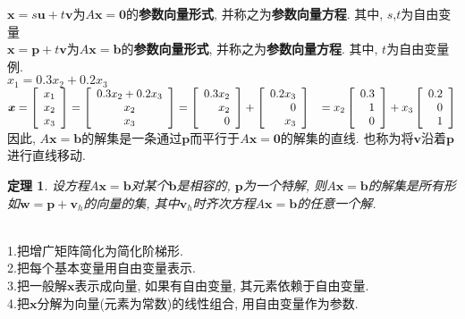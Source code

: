 \documentclass[UTF8,fontset=ubuntu]{ctexart}
\theoremstyle{nonumberplain}
\theoremstyle{break}
\newtheorem{theorem}{定理}
\theoremstyle{empty}
\begin{document}
$\bm{x}=s\bm{u}+t\bm{v}$为$A\bm{x}=\bm{0}$的\textbf{参数向量形式}, 并称之为\textbf{参数向量方程}. 其中, $s$,$t$为自由变量\\
$\bm{x}=\bm{p}+t\bm{v}$为$A\bm{x}=\bm{b}$的\textbf{参数向量形式}, 并称之为\textbf{参数向量方程}. 其中, $t$为自由变量\\
例.\\
$x_1=0.3x_2+0.2x_3$\\[1ex]
$\bm{x}=
\left[\begin{array}{l}
x_1\\
x_2\\
x_3
\end{array}\right]=
\left[\begin{array}{c}
0.3x_2+0.2x_3\\
x_2\\
x_3
\end{array}\right]=
\left[\begin{array}{r}
0.3x_2\\
x_2\\
0
\end{array}\right]+\left[\begin{array}{r}
0.2x_3\\
0\\
x_3
\end{array}\right]\\
\phantom{\bm{x}}=x_2\left[\begin{array}{r}
0.3\\
1\\
0
\end{array}\right]+x_3\left[\begin{array}{r}
0.2\\
0\\
1
\end{array}\right]
$\\[1ex]
因此, $A\bm{x}=\bm{b}$的解集是一条通过$\bm{p}$而平行于$A\bm{x}=\bm{0}$的解集的直线. 也称为将$\bm{v}$沿着$\bm{p}$进行直线移动.\\[2ex]

\begin{theorem}
设方程$A\bm{x}=\bm{b}$对某个$\bm{b}$是相容的, $\bm{p}$为一个特解, 则$A\bm{x}=\bm{b}$的解集是所有形如$\bm{w}=\bm{p}+\bm{v}_h$的向量的集, 其中$\bm{v}_h$时齐次方程$A\bm{x}=\bm{b}$的任意一个解.
\end{theorem}\vspace{3ex}

\begin{law}\ \\
1.把增广矩阵简化为简化阶梯形.\\
2.把每个基本变量用自由变量表示.\\
3.把一般解$\bm{x}$表示成向量, 如果有自由变量, 其元素依赖于自由变量.\\
4.把$\bm{x}$分解为向量(元素为常数)的线性组合, 用自由变量作为参数.
\end{law}\vspace{4ex}
\end{document}
